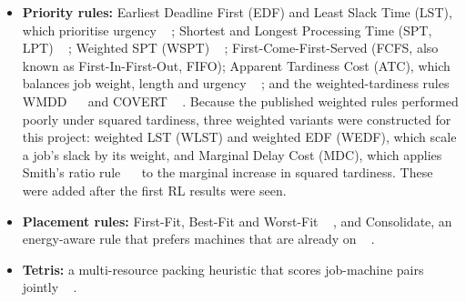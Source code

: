 \documentclass[12pt]{article}
\providecommand{\DIFaddtex}[1]{{\color{red}#1}} %
\providecommand{\DIFdeltex}[1]{} %
\providecommand{\DIFaddbegin}{} %
\providecommand{\DIFaddend}{} %
\providecommand{\DIFdelbegin}{} %
\providecommand{\DIFdelend}{} %
\providecommand{\DIFadd}[1]{\texorpdfstring{\DIFaddtex{#1}}{#1}} %
\providecommand{\DIFdel}[1]{\texorpdfstring{\DIFdeltex{#1}}{}} %
\providecommand{\DIFscaledelfig}{0.5}
\newlength{\DIFdelgraphicswidth} %
\newlength{\DIFdelgraphicsheight} %
\providecommand{\DIFaddincludegraphics}[2][]{{\color{blue}\fbox{\DIFOincludegraphics[#1]{#2}}}} %
\providecommand{\DIFdelincludegraphics}[2][]{%
\sbox{\DIFdelgraphicsbox}{\DIFOincludegraphics[#1]{#2}}%
\settoboxwidth{\DIFdelgraphicswidth}{\DIFdelgraphicsbox} %
\settoboxtotalheight{\DIFdelgraphicsheight}{\DIFdelgraphicsbox} %
\scalebox{\DIFscaledelfig}{%
\parbox[b]{\DIFdelgraphicswidth}{\usebox{\DIFdelgraphicsbox}\\[-\baselineskip] \rule{\DIFdelgraphicswidth}{0em}}\llap{\resizebox{\DIFdelgraphicswidth}{\DIFdelgraphicsheight}{%
\setlength{\unitlength}{\DIFdelgraphicswidth}%
\begin{picture}(1,1)%
\thicklines\linethickness{2pt} %
{\color[rgb]{1,0,0}\put(0,0){\framebox(1,1){}}}%
{\color[rgb]{1,0,0}\put(0,0){\line( 1,1){1}}}%
{\color[rgb]{1,0,0}\put(0,1){\line(1,-1){1}}}%
\end{picture}%
}\hspace*{3pt}}} %
} %
\DeclareRobustCommand{\DIFaddbegin}{\DIFOaddbegin \let\includegraphics\DIFaddincludegraphics} %
\DeclareRobustCommand{\DIFaddend}{\DIFOaddend \let\includegraphics\DIFOincludegraphics} %
\DeclareRobustCommand{\DIFdelbegin}{\DIFOdelbegin \let\includegraphics\DIFdelincludegraphics} %
\DeclareRobustCommand{\DIFdelend}{\DIFOaddend \let\includegraphics\DIFOincludegraphics} %
\begin{document}
\begin{itemize}
    \item \textbf{Priority \DIFdelbegin \DIFdel{Rules}\DIFdelend \DIFaddbegin \DIFadd{rules}\DIFaddend :} Earliest Deadline First (EDF) and Least Slack Time (LST), which prioritise urgency \DIFaddbegin \DIFadd{\mbox{%
\cite{pinedo2016scheduling}}\hskip0pt%
}\DIFaddend ; Shortest and Longest Processing Time (SPT\DIFdelbegin \DIFdel{) and (LPT) }\DIFdelend \DIFaddbegin \DIFadd{, LPT) \mbox{%
\cite{pinedo2016scheduling, graham1969lpt}}\hskip0pt%
}\DIFaddend ; Weighted SPT (WSPT) \DIFaddbegin \DIFadd{\mbox{%
\cite{smith1956wspt}}\hskip0pt%
}\DIFaddend ; First-Come-First-Served (FCFS\DIFdelbegin \DIFdel{), and the }\DIFdelend \DIFaddbegin \DIFadd{, also known as First-In-First-Out, FIFO); }\DIFaddend Apparent Tardiness Cost (ATC)\DIFdelbegin \DIFdel{rule, balancing }\DIFdelend \DIFaddbegin \DIFadd{, which balances }\DIFaddend job weight, length and urgency \DIFdelbegin \DIFdel{.
    }\DIFdelend \DIFaddbegin \DIFadd{\mbox{%
\cite{vepsalainen1987atc}}\hskip0pt%
; and the weighted-tardiness rules WMDD \mbox{%
\cite{kanet2004wmdd} }\hskip0pt%
and COVERT \mbox{%
\cite{carroll1965covert}}\hskip0pt%
. Because the published weighted rules performed poorly under squared tardiness, three weighted variants were constructed for this project: weighted LST (WLST) and weighted EDF (WEDF), which scale a job's slack by its weight, and Marginal Delay Cost (MDC), which applies Smith's ratio rule \mbox{%
\cite{smith1956wspt} }\hskip0pt%
to the marginal increase in squared tardiness. These were added after the first RL results were seen.
    }\DIFaddend \item \textbf{Placement \DIFdelbegin \DIFdel{Rules}\DIFdelend \DIFaddbegin \DIFadd{rules}\DIFaddend :} First-Fit, Best-Fit \DIFdelbegin \DIFdel{, }\DIFdelend \DIFaddbegin \DIFadd{and }\DIFaddend Worst-Fit \DIFaddbegin \DIFadd{\mbox{%
\cite{johnson1973binpacking}}\hskip0pt%
}\DIFaddend , and Consolidate, \DIFdelbegin \DIFdel{a more energy aware approach \mbox{%
\cite{energyaware2012}}\hskip0pt%
}\DIFdelend \DIFaddbegin \DIFadd{an energy-aware rule that prefers machines that are already on \mbox{%
\cite{energyaware2012}}\hskip0pt%
.
    }\DIFaddend \item \textbf{Tetris:} \DIFdelbegin \DIFdel{A }\DIFdelend \DIFaddbegin \DIFadd{a }\DIFaddend multi-resource packing heuristic \DIFdelbegin \DIFdel{scoring }\DIFdelend \DIFaddbegin \DIFadd{that scores }\DIFaddend job-machine pairs jointly \DIFaddbegin \DIFadd{\mbox{%
\cite{grandl2014tetris}}\hskip0pt%
}\DIFaddend .
\end{itemize}
\end{document}

